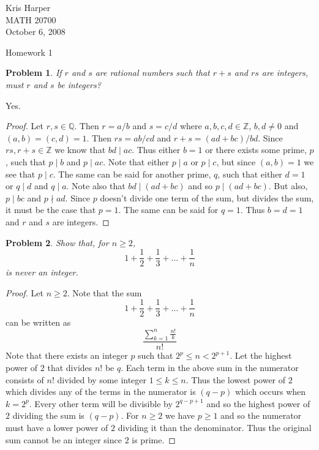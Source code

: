 \documentclass{article}
\newtheorem{problem}{Problem}
\begin{document}
\begin{flushright}
Kris Harper\\

MATH 20700\\

October 6, 2008
\end{flushright}

\begin{center}
Homework 1
\end{center}

\begin{flushleft}

\begin{problem}
If $r$ and $s$ are rational numbers such that $r+s$ and $rs$ are integers, must $r$ and $s$ be integers?
\end{problem}

Yes.
\begin{proof}
Let $r,s \in \mathbb{Q}$. Then $r=a/b$ and $s=c/d$ where $a,b,c,d \in \mathbb{Z}$, $b,d \neq 0$ and $(a,b) = (c,d) = 1$. Then $rs = ab/cd$ and $r+s = (ad+bc)/bd$. Since $rs, r+s \in \mathbb{Z}$ we know that $bd \mid ac$. Thus either $b=1$ or there exists some prime, $p$, such that $p \mid b$ and $p \mid ac$. Note that either $p \mid a$ or $p \mid c$, but since $(a,b) = 1$ we see that $p \mid c$. The same can be said for another prime, $q$, such that either $d=1$ or $q \mid d$ and $q \mid a$. Note also that $bd \mid (ad+bc)$ and so $p \mid (ad+bc)$. But also, $p \mid bc$ and $p \nmid ad$. Since $p$ doesn't divide one term of the sum, but divides the sum, it must be the case that $p=1$. The same can be said for $q=1$. Thus $b=d=1$ and $r$ and $s$ are integers.
\end{proof}

\begin{problem}
Show that, for $n \geq 2$,
\[
1 + \frac{1}{2} + \frac{1}{3} + \dots + \frac{1}{n}
\]
is never an integer.
\end{problem}
\begin{proof}
Let $n \geq 2$. Note that the sum
\[
1 + \frac{1}{2} + \frac{1}{3} + \dots + \frac{1}{n}
\]
can be written as
\[
\frac{\sum_{k=1}^{n} \frac{n!}{k}}{n!}
\]
Note that there exists an integer $p$ such that $2^p \leq n < 2^{p+1}$. Let the highest power of $2$ that divides $n!$ be $q$. Each term in the above sum in the numerator consists of $n!$ divided by some integer $1 \leq k \leq n$. Thus the lowest power of $2$ which divides any of the terms in the numerator is $(q-p)$ which occurs when $k=2^p$. Every other term will be divisible by $2^{q-p+1}$ and so the highest power of $2$ dividing the sum is $(q-p)$. For $n \geq 2$ we have $p \geq 1$ and so the numerator must have a lower power of $2$ dividing it than the denominator. Thus the original sum cannot be an integer since $2$ is prime.
\end{proof}


\end{flushleft}
\end{document}
